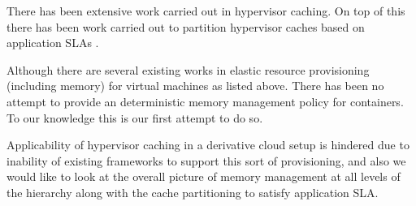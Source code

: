   There has been extensive work carried out in hypervisor caching\cite{lu2007virtual, magenheimer2009transcendent, mishra2014comparative, schopp2006resizing}.
  On top of this there has been work carried out to partition hypervisor caches based on application SLAs \cite{schopp2006resizing, koller2015centaur}.

  Although there are several existing works in elastic resource provisioning (including memory) for virtual machines as listed above. There 
  has been no attempt to provide an deterministic memory management policy for containers. To our knowledge this is our first attempt to do 
  so.
  
  Applicability of hypervisor caching in a derivative cloud setup is hindered due to inability of existing frameworks to support this sort of
  provisioning, and also we would like to look at the overall picture of memory management at all levels of the hierarchy along with the cache
  partitioning to satisfy application SLA. 

%     
%     
%       
%    